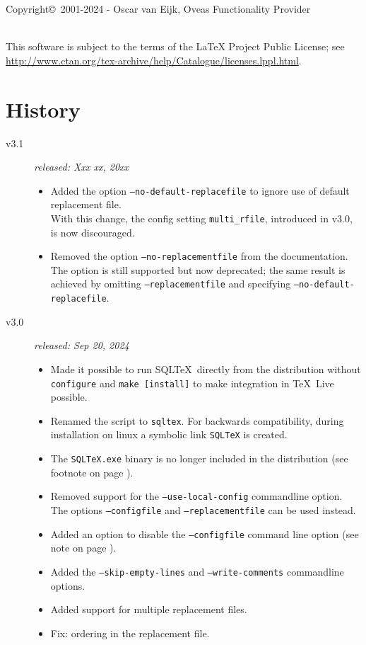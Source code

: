 \documentclass{article}
\begin{document}
\vspace{3mm}

\noindent Copyright\copyright\ 2001-2024 - Oscar van Eijk, Oveas Functionality Provider

\noindent\hrulefill \\

\noindent This software is subject to the terms of the LaTeX Project Public License; 
see \url{http://www.ctan.org/tex-archive/help/Catalogue/licenses.lppl.html}.

\section{History}


\begin{description}


\item[v3.1] \textit{released: Xxx xx, 20xx}
\begin{itemize}
\item Added the option \texttt{--no-default-replacefile} to ignore use of default replacement file.\\
With this change, the config setting \texttt{multi\_rfile}, introduced in v3.0, is now discouraged.
\item Removed the option \texttt{--no-replacementfile} from the documentation. The option is still supported but now deprecated; the same result is achieved by omitting \texttt{--replacementfile} and specifying \texttt{--no-default-replacefile}.
\end{itemize}

\item[v3.0] \textit{released: Sep 20, 2024}
\begin{itemize}
\item Made it possible to run SQL\TeX\ directly from the distribution without \texttt{configure} and \texttt{make [install]} to make integration in \TeX\ Live possible.
\item Renamed the script to \texttt{sqltex}. For backwards compatibility, during installation on linux a symbolic link \texttt{SQLTeX} is created.
\item The \texttt{SQLTeX.exe} binary is no longer included in the distribution (see footnote  on page \pageref{winexe}).
\item Removed support for the \texttt{--use-local-config} commandline option. The options \texttt{--configfile} and \texttt{--replacementfile} can be used instead.
\item Added an option to disable the \texttt{--configfile} command line option (see note on page \pageref{cfg:disable}).
\item Added the \texttt{--skip-empty-lines} and \texttt{--write-comments} commandline options.
\item Added support for multiple replacement files.
\item Fix: ordering in the replacement file.
\end{itemize}


\end{description}
\end{document}
